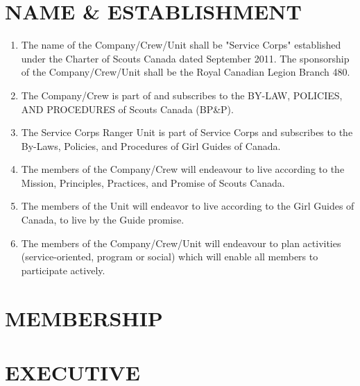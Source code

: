 \documentclass{Service_Corps_Document}
\begin{document}
    \def \Title {Constitution}
    \def \Company {Service Corps}
    \def \versionNumber {4.4}
    \stdFooter
    \begin{titlepage}
        \stdTitlePage
    \end{titlepage}

    \tableofcontents

    \newpage


    \section{NAME \& ESTABLISHMENT}\label{sec:name-&-establishment}
    \begin{enumerate}
        \item The name of the Company/Crew/Unit shall be "Service Corps" established under the Charter of Scouts Canada dated September 2011.
        The sponsorship of the Company/Crew/Unit shall be the Royal Canadian Legion Branch 480.
        \item The Company/Crew is part of and subscribes to the BY-LAW, POLICIES, AND PROCEDURES of Scouts Canada (BP\&P).
        \item The Service Corps Ranger Unit is part of Service Corps and subscribes to the By-Laws, Policies, and Procedures of Girl Guides of Canada.
        \item The members of the Company/Crew will endeavour to live according to the Mission, Principles, Practices, and Promise of Scouts Canada.
        \item The members of the Unit will endeavor to live according to the Girl Guides of Canada, to live by the Guide promise.
        \item The members of the Company/Crew/Unit will endeavour to plan activities (service-oriented, program or social) which will enable all members to participate actively.
    \end{enumerate}


    \section{MEMBERSHIP}\label{sec:membership}
    


    \section{EXECUTIVE}\label{sec:executive}
    
\end{document}
